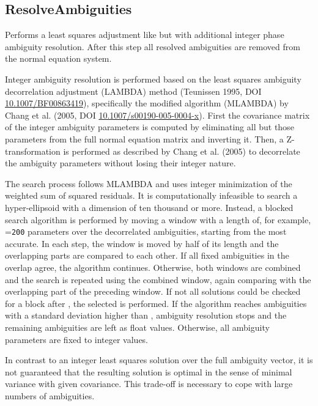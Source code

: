 \subsection{ResolveAmbiguities}\label{gnssProcessingStepType:resolveAmbiguities}
Performs a least squares adjustment like 
but with additional integer phase ambiguity resolution.
After this step all resolved ambiguities are removed from the normal equation system.

Integer ambiguity resolution is performed based on the least squares ambiguity decorrelation adjustment
(LAMBDA) method (Teunissen 1995, DOI \href{https://doi.org/10.1007/BF00863419}{10.1007/BF00863419}), specifically
the modified algorithm (MLAMBDA) by Chang et al. (2005, DOI \href{https://doi.org/10.1007/s00190-005-0004-x}{10.1007/s00190-005-0004-x}).
First the covariance matrix of the integer ambiguity parameters is computed by eliminating all but those parameters
from the full normal equation matrix and inverting it. Then, a Z-transformation is performed as described by
Chang et al. (2005) to decorrelate the ambiguity parameters without losing their integer nature.

The search process follows MLAMBDA and uses integer minimization of the weighted sum of squared residuals.
It is computationally infeasible to search a hyper-ellipsoid with a dimension of ten thousand or more.
Instead, a blocked search algorithm is performed by moving a window with a length of, for example,
=\verb|200| parameters over the decorrelated ambiguities, starting from the most accurate.
In each step, the window is moved by half of its length and the overlapping parts are compared to each other.
If all fixed ambiguities in the overlap agree, the algorithm continues.
Otherwise, both windows are combined and the search is repeated using the combined window, again comparing with the overlapping
part of the preceding window. If not all solutions could be checked for a block after ,
the selected  is performed.
If the algorithm reaches ambiguities with a standard deviation higher than ,
ambiguity resolution stops and the remaining ambiguities are left as float values.
Otherwise, all ambiguity parameters are fixed to integer values.

In contrast to an integer least squares solution over the full ambiguity vector, it is not guaranteed that the resulting solution
is optimal in the sense of minimal variance with given covariance.
This trade-off is necessary to cope with large numbers of ambiguities.



